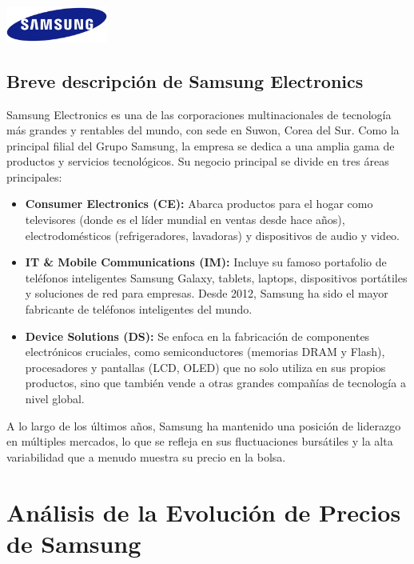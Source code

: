 \documentclass[12pt, a4paper]{article}
\begin{document}
\begin{center}
    \includegraphics[width=0.25\textwidth]{samsung_logo.png} %
\end{center}

\subsection*{Breve descripción de Samsung Electronics}
Samsung Electronics es una de las corporaciones multinacionales de tecnología más grandes y rentables del mundo, con sede en Suwon, Corea del Sur. Como la principal filial del Grupo Samsung, la empresa se dedica a una amplia gama de productos y servicios tecnológicos. Su negocio principal se divide en tres áreas principales:
\begin{itemize}
    \item \textbf{Consumer Electronics (CE):} Abarca productos para el hogar como televisores (donde es el líder mundial en ventas desde hace años), electrodomésticos (refrigeradores, lavadoras) y dispositivos de audio y video.
    \item \textbf{IT \& Mobile Communications (IM):} Incluye su famoso portafolio de teléfonos inteligentes Samsung Galaxy, tablets, laptops, dispositivos portátiles y soluciones de red para empresas. Desde 2012, Samsung ha sido el mayor fabricante de teléfonos inteligentes del mundo.
    \item \textbf{Device Solutions (DS):} Se enfoca en la fabricación de componentes electrónicos cruciales, como semiconductores (memorias DRAM y Flash), procesadores y pantallas (LCD, OLED) que no solo utiliza en sus propios productos, sino que también vende a otras grandes compañías de tecnología a nivel global.
\end{itemize}
A lo largo de los últimos años, Samsung ha mantenido una posición de liderazgo en múltiples mercados, lo que se refleja en sus fluctuaciones bursátiles y la alta variabilidad que a menudo muestra su precio en la bolsa.

\newpage

\section{Análisis de la Evolución de Precios de Samsung}
\end{document}
